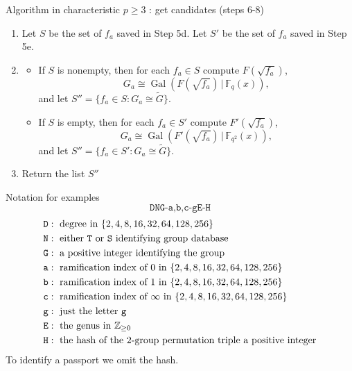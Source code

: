 \documentclass[xcolor=dvipsnames]{beamer}
\theoremstyle{plain}
\newcommand{\ZZ}{\mathbb Z}
\newcommand{\wt}[1]{\widetilde{#1}}
\newcommand{\FF}{\mathbb{F}}
\DeclareMathOperator{\Gal}{Gal}
\begin{document}
  \begin{frame}{Algorithm in characteristic $p\geq 3$ : get candidates (steps 6-8)}
    \begin{enumerate}
      \item[6.]
        Let $S$ be the set of $f_a$
        saved in Step 5d.
        Let $S'$ be the set of $f_a$
        saved in Step 5e.
      \item[7.]
        \begin{itemize}
          \item
            If $S$ is nonempty,
            then
            for each $f_a\in S$
            compute
            $F(\sqrt{f_a})$,
            \[
              G_a\cong\Gal(F(\sqrt{f_a})\,|\,\FF_q(x)),
            \]
            and let
            $S''=
            \{f_a\in S:G_a\cong\wt{G}\}$.
          \item
            If $S$ is empty,
            then
            for each $f_a\in S'$
            compute
            $F'(\sqrt{f_a})$,
            \[
              G_a\cong\Gal(F'(\sqrt{f_a})\,|\,\FF_{q^2}(x)),
            \]
            and let
            $S''=
            \{f_a\in S':G_a\cong\wt{G}\}$.
        \end{itemize}
      \item[8.]
        Return the list $S''$
    \end{enumerate}
  \end{frame}
  \begin{frame}{Notation for examples}
    \begin{equation*}
      \texttt{DNG-a,b,c-gE-H}
    \end{equation*}
    \begin{align*}
      \texttt{D} &:\text{ degree in }
      \{2,4,8,16,32,64,128,256\}\\
      \texttt{N} &:\text{ either \texttt{T}
      or \texttt{S} identifying group
      database}\\
      \texttt{G} &:\text{ a positive integer
      identifying the group}\\
      \texttt{a} &:\text{ ramification index
      of $0$ in }
      \{2,4,8,16,32,64,128,256\}\\
      \texttt{b} &:\text{ ramification index
      of $1$ in }
      \{2,4,8,16,32,64,128,256\}\\
      \texttt{c} &:\text{ ramification index
      of $\infty$ in }
      \{2,4,8,16,32,64,128,256\}\\
      \texttt{g} &:\text{ just the letter 
      \texttt{g}}\\
      \texttt{E} &:\text{ the genus in }
      \ZZ_{\geq 0}\\
      \texttt{H} &:\text{ the hash
      of the $2$-group permutation triple 
      a positive integer}
    \end{align*}
    To identify a passport we omit the hash.
  \end{frame}
\end{document}
